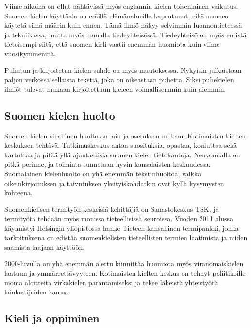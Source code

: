 \begin{multicols}{2}
Viime aikoina on ollut nähtävissä myös englannin kielen toisenlainen vaikutus.  Suomen kielen käyttöala on eräillä elämänalueilla kapeutunut, eikä suomea käytetä siinä määrin kuin ennen. Tämä ilmiö näkyy selvimmin luonnontieteessä ja tekniikassa, mutta myös muualla tiedeyhteisössä. Tiedeyhteisö on myös entistä tietoisempi siitä, että suomen kieli vaatii enemmän huomiota kuin viime vuosikymmeninä.

Puhutun ja kirjoitetun kielen suhde on myös muutoksessa. Nykyisin julkaistaan paljon verkossa sellaista tekstiä, joka on oikeastaan puhetta. Siksi puhekielen ilmiöt tulevat mukaan kirjoitettuun kieleen voimallisemmin kuin aiemmin.

\subsection{Suomen kielen huolto}

Suomen kielen virallinen huolto on lain ja asetuksen mukaan Kotimaisten kielten keskuksen tehtävä. Tutkimuskeskus antaa suosituksia, opastaa, kouluttaa sekä kartuttaa ja pitää yllä ajantasaisia suomen kielen tietokantoja.  Neuvonnalla on pitkä perinne, ja toiminta tunnetaan hyvin kansalaisten keskuudessa. Suomalainen kielenhuolto on yhä enemmän tekstinhuoltoa, vaikka oikeinkirjoituksen ja taivutuksen yksityiskohdatkin ovat kyllä kysymysten kohteena.


Suomenkielisen termityön keskeisiä kehittäjiä on Sanastokeskus TSK, ja termityötä tehdään myös monissa tieteellisissä seuroissa. Vuoden 2011 alussa käynnistyi Helsingin yliopistossa hanke Tieteen kansallinen termipankki, jonka tarkoituksena on edistää suomenkielisten tieteellisten termien laatimista ja niiden saamista laajaan käyttöön.

2000-luvulla on yhä enemmän alettu kiinnittää huomiota myös viranomaiskielen laatuun ja ymmärrettävyyteen. Kotimaisten kielten keskus on tehnyt poliitikoille monia aloitteita virkakielen parantamiseksi ja tekee läheistä yhteistyötä lainlaatijoiden kanssa.

\subsection{Kieli ja oppiminen}
 

\end{multicols}
